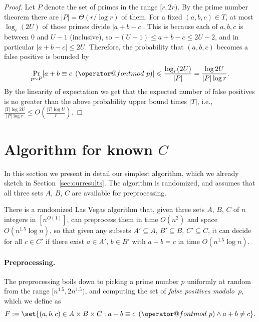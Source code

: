 \documentclass{theoretics}
\makeatletter
\newcommand{\tpmod}[1]{\mkern 8mu({\operator@font mod}\mkern 6mu#1)}
\makeatother
\begin{document}
\begin{proof}
Let $P$ denote the set of primes in the range $[r,2r)$. By the prime number theorem there are $|P| = \Theta(r / \log r)$ of them. For a fixed $(a,b,c) \in T$, at most $\log_r(2U)$ of those primes divide $|a+b-c|$. This is because each of $a,b,c$ is between $0$ and $U-1$ (inclusive), so $-(U-1) \leqslant a+b-c \leqslant 2U - 2$, and in particular $|a+b-c| \leqslant 2U$. Therefore, the probability that $(a,b,c)$ becomes a false positive is bounded by
\[\operatornamewithlimits{Pr}_{p \sim P}[a + b \equiv c \tpmod{p}] \leqslant \frac{\log_r(2U)}{|P|} = \frac{\log 2U}{|P| \log r}.\]
By the linearity of expectation we get that the expected number of false positives is no greater than the above probability upper bound times $|T|$, i.e., $\frac{|T|\log 2U}{|P| \log r} \leqslant O(\frac{|T|\log U}{r})$.
\end{proof}
        
\section{Algorithm for known \texorpdfstring{$C$}{C}}
\label{sec:knownc}

In this section we present in detail our simplest algorithm, which we already sketch in Section~\ref{sec:ourresults}. The algorithm is randomized, and assumes that all three sets $A$, $B$, $C$ are available for preprocessing.
    
\begin{theorem}\label{thm:knownc}
    There is a randomized Las Vegas algorithm that,
    given three sets $A$, $B$, $C$ of $n$ integers in $[n^{O(1)}]$, can preprocess them in time $O(n^2)$ and space $O(n^{1.5} \log n)$, so that given any subsets $A' \subseteq A$, $B' \subseteq B$, $C' \subseteq C$, it can decide for all $c \in C'$ if there exist $a \in A'$, $b \in B'$ with $a+b=c$ in time $O(n^{1.5} \log n)$.
\end{theorem}

\paragraph{Preprocessing.}

The preprocessing boils down to picking a prime number $p$ uniformly at random from the range $[n^{1.5}, 2n^{1.5})$, and computing the set of \emph{false positives modulo~$p$}, which we define as
\[F:= \set{ (a,b,c) \in A \times B \times C : a + b \equiv c \tpmod{p} \land a + b \neq c }.\]
\end{document}
